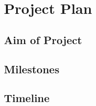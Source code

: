 \documentclass[12pt,a4paper]{article}
\begin{document}
\section{Project Plan}
\subsection{Aim of Project}
\subsection{Milestones}
\subsection{Timeline}


\newpage


\end{document}
